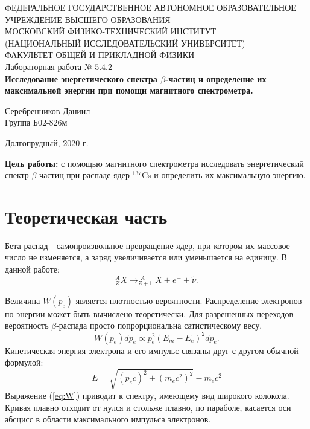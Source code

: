 \documentclass[a4paper,12pt]{article} %
\begin{document}
\begin{center}
	\footnotesize{ФЕДЕРАЛЬНОЕ ГОСУДАРСТВЕННОЕ АВТОНОМНОЕ ОБРАЗОВАТЕЛЬНОЕ 			УЧРЕЖДЕНИЕ ВЫСШЕГО ОБРАЗОВАНИЯ}\\
	\footnotesize{МОСКОВСКИЙ ФИЗИКО-ТЕХНИЧЕСКИЙ ИНСТИТУТ\\(НАЦИОНАЛЬНЫЙ 			ИССЛЕДОВАТЕЛЬСКИЙ УНИВЕРСИТЕТ)}\\
	\footnotesize{ФАКУЛЬТЕТ ОБЩЕЙ И ПРИКЛАДНОЙ ФИЗИКИ\\}
	\hfill \break
	\hfill\break
	\hfill\break
	\hfill \break
	\hfill \break
	\hfill \break
	\hfill \break
	\hfill \break
	\hfill \break
	\hfill \break
	\hfill \break
	\hfill \break
	\hfill \break
	\hfill \break
	\large{Лабораторная работа № 5.4.2 \\\textbf{Исследование энергетического спектра $\beta$-частиц и определение их максимальной энергии при помощи магнитного спектрометра.}}\\
	\hfill \break
	\hfill \break
	\hfill \break
	\begin{flushright}
		Серебренников Даниил\\
		Группа Б02-826м
	\end{flushright}
	\hfill \break
	\hfill \break
	\hfill \break
	\hfill \break
	\hfill \break
	\hfill \break
	\hfill \break
	\hfill \break
	\hfill \break
	\hfill \break
\end{center}
\begin{center}
	Долгопрудный, 2020 г.
\end{center}
\thispagestyle{empty}
\newpage
	\textbf{Цель работы:} с помощью магнитного спектрометра исследовать энергетический спектр $\beta$-частиц при распаде ядер $^{137}$Cs и определить их максимальную энергию.

\section{Теоретическая часть}
	
	Бета-распад - самопроизвольное превращение ядер, при котором их массовое число не изменяется, а заряд увеличивается или уменьшается на единицу.
	В данной работе:
	$$^A_Z X \to ^{\ \, A}_{Z+1} X + e^- + \widetilde{\nu} .$$
	
	Величина $W(p_e)$ является плотностью вероятности. Распределение электронов по энергии может быть вычислено теоретически. Для разрешенных переходов вероятность $\beta$-распада просто попрорциональна сатистическому весу.
	\begin{equation*}
		\label{eq:W}
		W(p_e)dp_e \propto p_e^2(E_m-E_e)^2 dp_e.
	\end{equation*}
	Кинетическая энергия электрона и его импульс связаны друг с другом обычной формулой:
	\begin{equation*}
		E = \sqrt{(p_ec)^2+(m_ec^2)^2}-m_ec^2
	\end{equation*}
	Выражение (\ref{eq:W}) приводит к спектру, имеющему вид широкого колокола. Кривая плавно отходит от нулся и стольже плавно, по параболе, касается оси абсцисс в области максимального импульса электронов.
	
\end{document}
